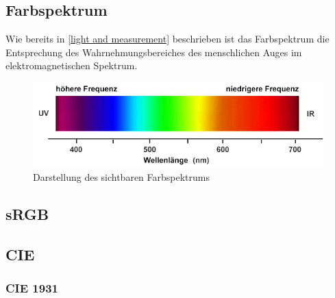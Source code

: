 \documentclass[11pt]{scrartcl}
\begin{document}
\subsection{Farbspektrum}
Wie bereits in \ref{light and measurement} beschrieben ist das Farbspektrum die Entsprechung des Wahrnehmungsbereiches des menschlichen
Auges im elektromagnetischen Spektrum.
\begin{figure}[H]
    \includegraphics[width=\textwidth]{images/farbspektrum.png}
    \caption{Darstellung des sichtbaren Farbspektrums \cite{fhtEsslignen}}
\end{figure}
\subsection{sRGB}
\subsection{CIE}
\subsubsection{CIE 1931}
\clearpage

\end{document}
